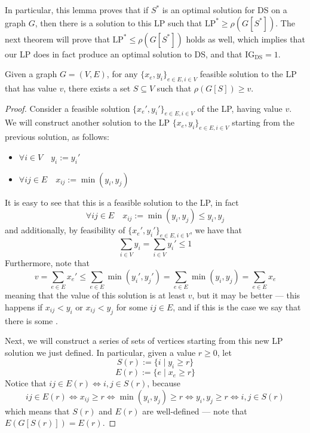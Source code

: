 \documentclass[a4paper, 12pt]{report}
\begin{document}
    In particular, this lemma proves that if $S^*$ is an optimal solution for DS on a graph $G$, then there is a solution to this LP such that $\mathrm{LP^*} \ge \rho(G[S^*])$. The next theorem will prove that $\mathrm{LP^*} \le \rho(G[S^*])$ holds as well, which implies that our LP does in fact produce an optimal solution to DS, and that $\mathrm{IG_{DS}} = 1$.

    \begin{framedthm}{}
        Given a graph $G = (V, E)$, for any $\{x_e, y_i\}_{e \in E, i \in V}$ feasible solution to the LP that has value $v$, there exists a set $S \subseteq V$ such that $\rho(G[S]) \ge v$.
    \end{framedthm}

    \begin{proof}
        Consider a feasible solution $\{x_e', y_i'\}_{e \in E, i \in V}$ of the LP, having value $v$. We will construct another solution to the LP $\{x_e, y_i\}_{e \in E, i \in V}$ starting from the previous solution, as follows:

        \begin{itemize}
            \item $\forall i \in V \quad y_i := y_i'$
            \item $\forall ij \in E \quad x_{ij} := \min(y_i, y_j)$
        \end{itemize}

        It is easy to see that this is a feasible solution to the LP, in fact $$\forall ij \in E \quad x_{ij} := \min(y_i, y_j) \le y_i, y_j$$ and additionally, by feasibility of $\{x_e', y_i'\}_{e \in E, i \in V}$, we have that $$\sum_{i \in V}{y_i} = \sum_{i \in V}{y_i'} \le 1$$ Furthermore, note that $$v = \sum_{e \in E}{x_e'} \le \sum_{e \in E}{\min(y_i', y_j')} = \sum_{e \in E}{\min(y_i, y_j)} = \sum_{e \in E}{x_e}$$ meaning that the value of this solution is at least $v$, but it may be better --- this happens if $x_{ij} < y_i$ or $x_{ij} < y_j$ for some $ij \in E$, and if this is the case we say that there is some .

        Next, we will construct a series of sets of vertices starting from this new LP solution we just defined. In particular, given a value $r \ge 0$, let $$S(r) := \{i \mid y_i \ge r\}$$ $$E(r) := \{e \mid x_e \ge r\}$$ Notice that $ij \in E(r) \iff i, j \in S(r)$, because $$ij \in E(r) \iff x_{ij} \ge r \iff \min(y_i, y_j) \ge r \iff y_i, y_j \ge r \iff i,j \in S(r)$$ which means that $S(r)$ and $E(r)$ are well-defined --- note that $E(G[S(r)]) = E(r)$.


\end{proof}
\end{document}
